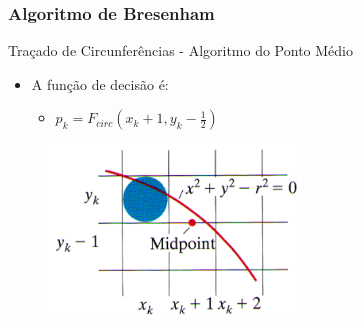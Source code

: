 \documentclass{beamer}
\begin{document}
\begin{frame}
\frametitle{Algoritmo de Bresenham}
		\begin{block}{Traçado de Circunferências - Algoritmo do Ponto Médio}
		\begin{itemize}
			\item A função de decisão é:
				\begin{itemize}
					\item $p_k = F_{circ}(x_k+1,y_k-\frac{1}{2})$
				\end{itemize}
		\end{itemize}
	\end{block}
	
	\begin{figure}[!h]
			\begin{center}
			\includegraphics[width=0.6\textwidth]{Figures/CirAlg}
			\end{center}
		\end{figure}
\end{frame}
\end{document}
